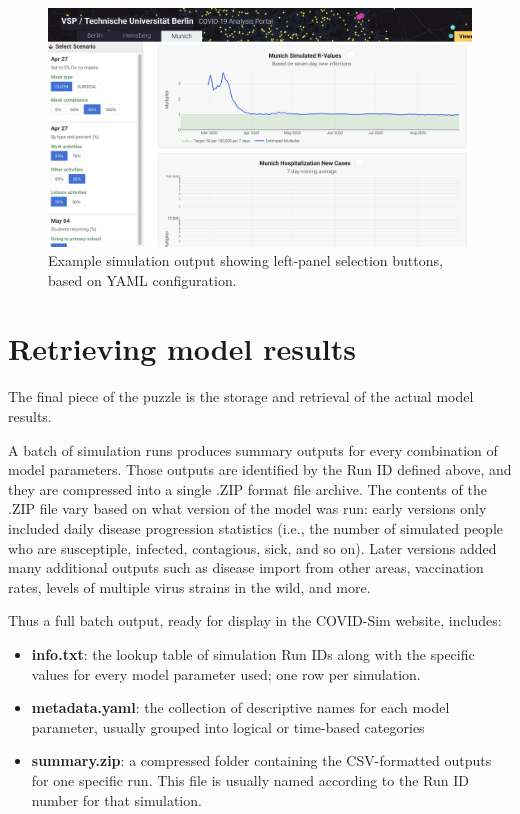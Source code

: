 \begin{figure}
  \centering
	\begin{minipage}{0.9\textwidth}
    \includegraphics[width=\textwidth]{chapters/21-covid-sim/images/covid-buttons.png}
  \caption{Example simulation output showing left-panel selection buttons, based on YAML configuration.}
  \label{fig:covid-buttons}
	\end{minipage}
\end{figure}


\hypertarget{covid-retrieving-model-results}{%
\section{Retrieving model results}\label{retrieving-model-results}}

The final piece of the puzzle is the storage and retrieval of the actual model results.

A batch of simulation runs produces summary outputs for every combination of model parameters. Those outputs are identified by the Run ID defined above, and they are compressed into a single .ZIP format file archive. The contents of the .ZIP file vary based on what version of the model was run: early versions only included daily disease progression statistics (i.e., the number of simulated people who are susceptiple, infected, contagious, sick, and so on). Later versions added many additional outputs such as disease import from other areas, vaccination rates, levels of multiple virus strains in the wild, and more.

Thus a full batch output, ready for display in the COVID-Sim website,
includes:

\begin{itemize}
\item
  \textbf{info.txt}: the lookup table of simulation Run IDs along with the specific
  values for every model parameter used; one row per simulation.
\item
  \textbf{metadata.yaml}: the collection of descriptive names for each model parameter,
  usually grouped into logical or time-based categories
\item
  \textbf{summary.zip}: a compressed folder containing the CSV-formatted outputs for one
  specific run. This file is usually named according to the Run ID number for that simulation.
\end{itemize}

